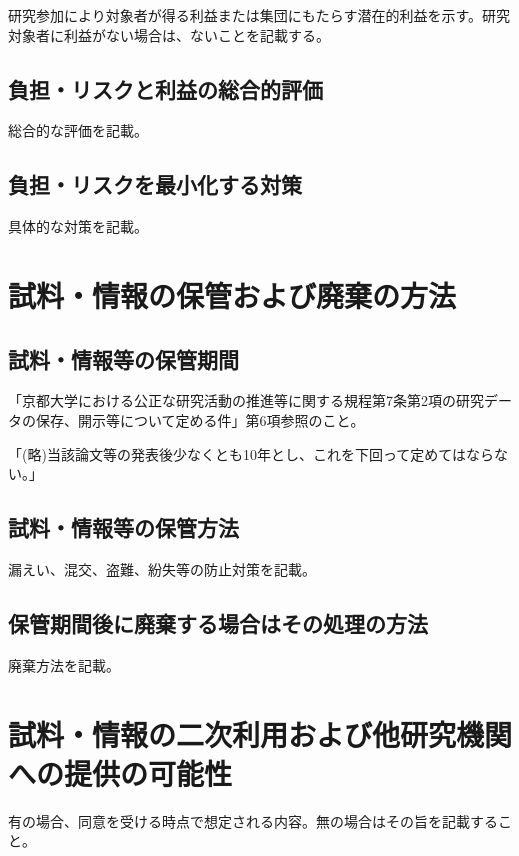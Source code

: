 \documentclass{kyodai-protocol}
\begin{document}
研究参加により対象者が得る利益または集団にもたらす潜在的利益を示す。研究対象者に利益がない場合は、ないことを記載する。

\subsection{負担・リスクと利益の総合的評価}

総合的な評価を記載。

\subsection{負担・リスクを最小化する対策}

具体的な対策を記載。

\section{試料・情報の保管および廃棄の方法}
\label{sec:storage}

\subsection{試料・情報等の保管期間}

「京都大学における公正な研究活動の推進等に関する規程第7条第2項の研究データの保存、開示等について定める件」第6項参照のこと。

「(略)当該論文等の発表後少なくとも10年とし、これを下回って定めてはならない。」

\subsection{試料・情報等の保管方法}

漏えい、混交、盗難、紛失等の防止対策を記載。

\subsection{保管期間後に廃棄する場合はその処理の方法}

廃棄方法を記載。

\section{試料・情報の二次利用および他研究機関への提供の可能性}
\label{sec:secondary-use}

有の場合、同意を受ける時点で想定される内容。無の場合はその旨を記載すること。
\end{document}
